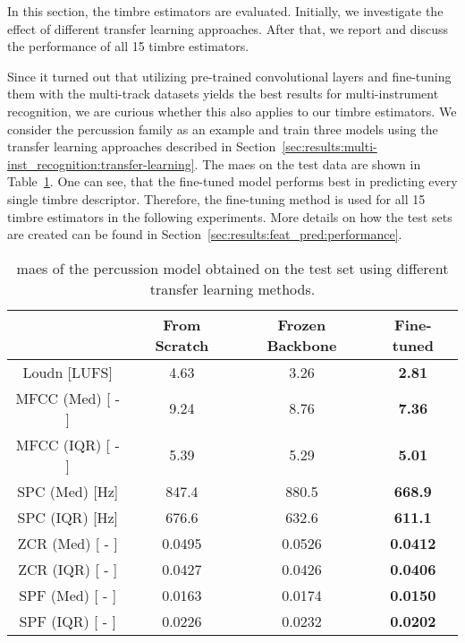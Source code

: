 In this section, the timbre estimators are evaluated. Initially, we investigate the effect of different transfer learning approaches. After that, we report and discuss the performance of all 15 timbre estimators.

Since it turned out that utilizing pre-trained convolutional layers and fine-tuning them with the multi-track datasets yields the best results for multi-instrument recognition, we are curious whether this also applies to our timbre estimators. We consider the percussion family as an example and train three models using the transfer learning approaches described in Section~\ref{sec:results:multi-inst_recognition:transfer-learning}. The \glspl{mae} on the test data are shown in Table~\ref{tab:feat-pred-transfer-learning}. One can see, that the fine-tuned model performs best in predicting every single timbre descriptor. Therefore, the fine-tuning method is used for all 15 timbre estimators in the following experiments. More details on how the test sets are created can be found in Section~\ref{sec:results:feat_pred:performance}.\\
\begin{table}[]
	\centering
	\begin{tabular}{c|c|c|c}
		                & From Scratch  & Frozen Backbone   & Fine-tuned  \\ \hline
		Loudn [LUFS]    & 4.63          & 3.26              & \textbf{2.81} \\ \hline
		MFCC (Med) [ - ]& 9.24          & 8.76              & \textbf{7.36}  \\ \hline
		MFCC (IQR) [ - ]& 5.39          & 5.29              & \textbf{5.01}  \\ \hline
		SPC (Med) [Hz]	& 847.4         & 880.5             & \textbf{668.9}\\ \hline
		SPC (IQR) [Hz]	& 676.6         & 632.6             & \textbf{611.1}\\ \hline
		ZCR (Med) [ - ] & 0.0495        & 0.0526            & \textbf{0.0412}\\ \hline
		ZCR (IQR) [ - ] & 0.0427        & 0.0426            & \textbf{0.0406} \\ \hline
		SPF (Med) [ - ] & 0.0163        & 0.0174            & \textbf{0.0150} \\ \hline
		SPF (IQR) [ - ] & 0.0226        & 0.0232            & \textbf{0.0202} \\
	\end{tabular}
	\caption{\Glspl{mae} of the percussion model obtained on the test set using different transfer learning methods.}
	\label{tab:feat-pred-transfer-learning}
\end{table}

